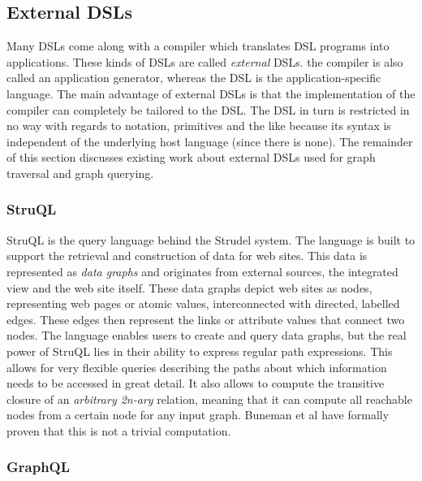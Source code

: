 \subsection{External DSLs}

Many DSLs come along with a compiler which translates DSL programs into applications. These kinds of DSLs are called \textit{external} DSLs. the compiler is also called an application generator\cite{Cleaveland:1988}, whereas the DSL is the application-specific language. The main advantage of external DSLs is that the implementation of the compiler can completely be tailored to the DSL. The DSL in turn is restricted in no way with regards to notation, primitives and the like because its syntax is independent of the underlying host language (since there is none). The remainder of this section discusses existing work about external DSLs used for graph traversal and graph querying.

\subsubsection*{StruQL}

StruQL is the query language behind the Strudel system\cite{Fernandez97aquery}. The language is built to support the retrieval and construction of data for web sites. This data is represented as \textit{data graphs} and originates from external sources, the integrated view and the web site itself. These data graphs depict web sites as nodes, representing web pages or atomic values, interconnected with directed, labelled edges. These edges then represent the links or attribute values that connect two nodes. The language enables users to create and query data graphs, but the real power of StruQL lies in their ability to express regular path expressions. This allows for very flexible queries describing the paths about which information needs to be accessed in great detail.
It also allows to compute the transitive closure of an \textit{arbitrary 2n-ary} relation, meaning that it can compute all reachable nodes from a certain node for any input graph. Buneman et al\cite{Buneman:1996} have formally proven that this is not a trivial computation.

\subsubsection*{GraphQL}

